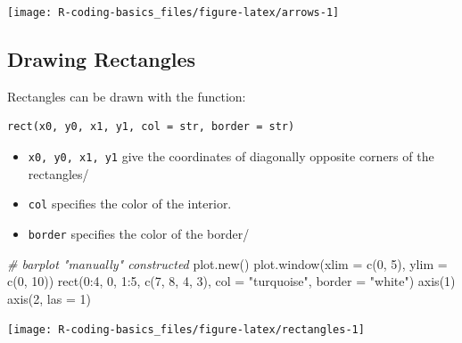 \documentclass[
]{book}
\newenvironment{Shaded}{\begin{snugshade}}{\end{snugshade}}
\newcommand{\AttributeTok}[1]{\textcolor[rgb]{0.77,0.63,0.00}{#1}}
\newcommand{\CommentTok}[1]{\textcolor[rgb]{0.56,0.35,0.01}{\textit{#1}}}
\newcommand{\DecValTok}[1]{\textcolor[rgb]{0.00,0.00,0.81}{#1}}
\newcommand{\FunctionTok}[1]{\textcolor[rgb]{0.00,0.00,0.00}{#1}}
\newcommand{\NormalTok}[1]{#1}
\newcommand{\SpecialCharTok}[1]{\textcolor[rgb]{0.00,0.00,0.00}{#1}}
\newcommand{\StringTok}[1]{\textcolor[rgb]{0.31,0.60,0.02}{#1}}
\begin{document}
\begin{center}\texttt{[image: R-coding-basics\_files/figure-latex/arrows-1]} \end{center}

\hypertarget{drawing-rectangles}{%
\subsection{Drawing Rectangles}\label{drawing-rectangles}}

Rectangles can be drawn with the function:

\begin{verbatim}
rect(x0, y0, x1, y1, col = str, border = str)
\end{verbatim}

\begin{itemize}
\item
  \texttt{x0,\ y0,\ x1,\ y1} give the coordinates of diagonally opposite corners of the
  rectangles/
\item
  \texttt{col} specifies the color of the interior.
\item
  \texttt{border} specifies the color of the border/
\end{itemize}

\begin{Shaded}
\begin{Highlighting}[]
\CommentTok{\# barplot "manually" constructed}
\FunctionTok{plot.new}\NormalTok{()}
\FunctionTok{plot.window}\NormalTok{(}\AttributeTok{xlim =} \FunctionTok{c}\NormalTok{(}\DecValTok{0}\NormalTok{, }\DecValTok{5}\NormalTok{), }\AttributeTok{ylim =} \FunctionTok{c}\NormalTok{(}\DecValTok{0}\NormalTok{, }\DecValTok{10}\NormalTok{))}
\FunctionTok{rect}\NormalTok{(}\DecValTok{0}\SpecialCharTok{:}\DecValTok{4}\NormalTok{, }\DecValTok{0}\NormalTok{, }\DecValTok{1}\SpecialCharTok{:}\DecValTok{5}\NormalTok{, }\FunctionTok{c}\NormalTok{(}\DecValTok{7}\NormalTok{, }\DecValTok{8}\NormalTok{, }\DecValTok{4}\NormalTok{, }\DecValTok{3}\NormalTok{), }
     \AttributeTok{col =} \StringTok{"turquoise"}\NormalTok{,}
     \AttributeTok{border =} \StringTok{"white"}\NormalTok{)}
\FunctionTok{axis}\NormalTok{(}\DecValTok{1}\NormalTok{)}
\FunctionTok{axis}\NormalTok{(}\DecValTok{2}\NormalTok{, }\AttributeTok{las =} \DecValTok{1}\NormalTok{)}
\end{Highlighting}
\end{Shaded}

\begin{center}\texttt{[image: R-coding-basics\_files/figure-latex/rectangles-1]} \end{center}
\end{document}
